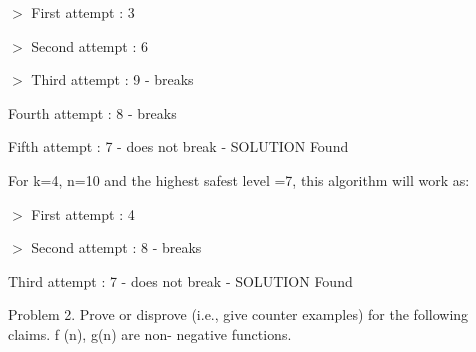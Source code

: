 \documentclass[letterpaper,portrait,12pt]{article}
\begin{document}
\begin{flushleft}
 $>$ First attempt : 3
\end{flushleft}


\begin{flushleft}
 $>$ Second attempt : 6
\end{flushleft}


\begin{flushleft}
 $>$ Third attempt : 9 - breaks
\end{flushleft}


\begin{flushleft}
	Fourth attempt : 8 - breaks
\end{flushleft}


\begin{flushleft}
	Fifth attempt : 7 - does not break - SOLUTION Found
\end{flushleft}


\begin{flushleft}

\end{flushleft}


\begin{flushleft}
For k=4, n=10 and the highest safest level =7, this algorithm will work as:
\end{flushleft}


\begin{flushleft}
 $>$ First attempt : 4
\end{flushleft}


\begin{flushleft}
 $>$ Second attempt : 8 - breaks
\end{flushleft}


\begin{flushleft}
	Third attempt : 7 - does not break - SOLUTION Found
\end{flushleft}


\begin{flushleft}

\end{flushleft}


\begin{flushleft}
Problem 2. Prove or disprove (i.e., give counter examples) for the following claims. f (n), g(n) are non- negative functions.
\end{flushleft}


\begin{flushleft}

\end{flushleft}
\end{document}
